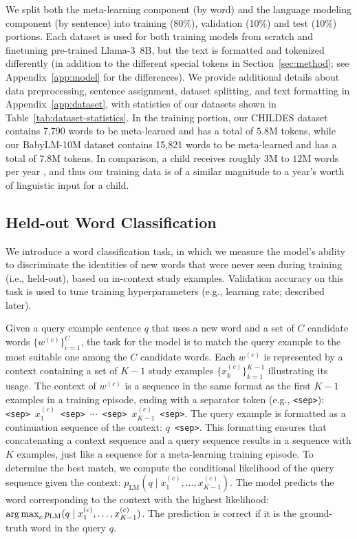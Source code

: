 \documentclass{article}
\begin{document}
We split both the meta-learning component (by word) and the language modeling component (by sentence) into training (80\%), validation (10\%) and test (10\%) portions.
Each dataset is used for both training models from scratch and finetuning pre-trained \mbox{Llama-3 8B}, but the text is formatted and tokenized differently (in addition to the different special tokens in Section~\ref{sec:method}; see Appendix~\ref{app:model} for the differences).
We provide additional details about data preprocessing, sentence assignment, dataset splitting, and text formatting in Appendix~\ref{app:dataset}, with statistics of our datasets shown in Table~\ref{tab:dataset-statistics}.
In the training portion, our CHILDES dataset contains 7,790 words to be meta-learned and has a total of $5.8$M tokens, while our BabyLM-10M dataset contains 15,821 words to be meta-learned and has a total of $7.8$M tokens.
In comparison, a child receives roughly $3$M to $12$M words per year \citep{Frank2023BridgingTD}, and thus our training data is of a similar magnitude to a year's worth of linguistic input for a child.

\subsection{Held-out Word Classification}
\label{sec:word-classification}

We introduce a word classification task, in which we measure the model's ability to discriminate the identities of new words that were never seen during training (i.e., held-out), based on in-context study examples. Validation accuracy on this task is used to tune training hyperparameters (e.g., learning rate; described later).

Given a query example sentence $q$ that uses a new word and a set of $C$ candidate words $\{w^{(c)}\}_{c=1}^{C}$, the task for the model is to match the query example to the most suitable one among the $C$ candidate words. Each $w^{(c)}$ is represented by a context containing a set of $K-1$ study examples $\{x^{(c)}_k\}_{k=1}^{K-1}$ illustrating its usage. The context of $w^{(c)}$ is a sequence in the same format as the first $K-1$ examples in a training episode, ending with a separator token (e.g., \texttt{<sep>}): \texttt{<sep>}~$x^{(c)}_1$~\texttt{<sep>}~$\cdots$~\texttt{<sep>}~$x^{(c)}_{K-1}$~\texttt{<sep>}. The query example is formatted as a continuation sequence of the context: $q$~\texttt{<sep>}.
This formatting ensures that concatenating a context sequence and a query sequence results in a sequence with $K$ examples, just like a sequence for a meta-learning training episode.
To determine the best match, we compute the conditional likelihood of the query sequence given the context: $p_\textrm{LM}(q \mid x^{(c)}_1, \ldots, x^{(c)}_{K-1})$. The model predicts the word corresponding to the context with the highest likelihood: $\operatorname*{arg\,max}_{c} p_\textrm{LM}(q \mid x^{(c)}_1, \ldots, x^{(c)}_{K-1})$.
The prediction is correct if it is the ground-truth word in the query $q$.
\end{document}
